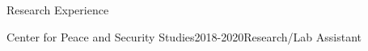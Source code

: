 \documentclass[10pt]{resume} %
\begin{document}
\begin{rSection}{Research Experience}
\begin{rSubsection}{Center for Peace and Security Studies}{2018-2020}{Research/Lab Assistant}{}
		\end{rSubsection}
		
		
		
	\end{rSection}
		
	
\end{document}
